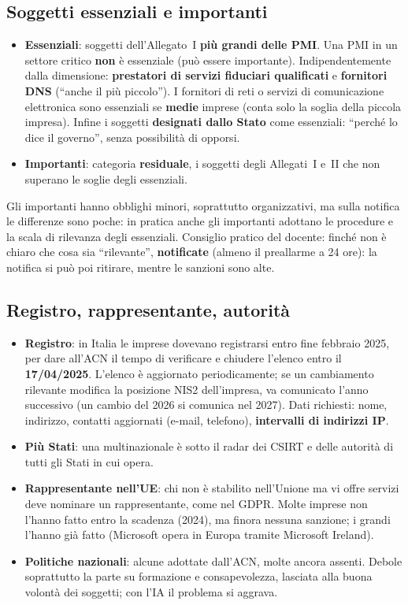 \subsection{Soggetti essenziali e importanti}
\begin{itemize}
  \item \textbf{Essenziali}: soggetti dell'Allegato~I \textbf{più grandi delle PMI}. Una PMI in un
    settore critico \textbf{non} è essenziale (può essere importante). Indipendentemente dalla
    dimensione: \textbf{prestatori di servizi fiduciari qualificati} e \textbf{fornitori DNS} (``anche il
    più piccolo''). I fornitori di reti o servizi di comunicazione elettronica sono essenziali se
    \textbf{medie} imprese (conta solo la soglia della piccola impresa). Infine i soggetti
    \textbf{designati dallo Stato} come essenziali: ``perché lo dice il governo'', senza possibilità di
    opporsi.
  \item \textbf{Importanti}: categoria \textbf{residuale}, i soggetti degli Allegati~I e~II che non
    superano le soglie degli essenziali.
\end{itemize}
Gli importanti hanno obblighi minori, soprattutto organizzativi, ma sulla notifica le differenze sono
poche: in pratica anche gli importanti adottano le procedure e la scala di rilevanza degli essenziali.
Consiglio pratico del docente: finché non è chiaro che cosa sia ``rilevante'', \textbf{notificate}
(almeno il preallarme a 24 ore): la notifica si può poi ritirare, mentre le sanzioni sono alte.

\subsection{Registro, rappresentante, autorità}
\begin{itemize}
  \item \textbf{Registro}: in Italia le imprese dovevano registrarsi entro fine febbraio 2025, per dare
    all'ACN il tempo di verificare e chiudere l'elenco entro il \textbf{17/04/2025}. L'elenco è
    aggiornato periodicamente; se un cambiamento rilevante modifica la posizione NIS2 dell'impresa, va
    comunicato l'anno successivo (un cambio del 2026 si comunica nel 2027). Dati richiesti: nome,
    indirizzo, contatti aggiornati (e-mail, telefono), \textbf{intervalli di indirizzi IP}.
  \item \textbf{Più Stati}: una multinazionale è sotto il radar dei CSIRT e delle autorità di tutti gli
    Stati in cui opera.
  \item \textbf{Rappresentante nell'UE}: chi non è stabilito nell'Unione ma vi offre servizi deve
    nominare un rappresentante, come nel GDPR. Molte imprese non l'hanno fatto entro la scadenza (2024),
    ma finora nessuna sanzione; i grandi l'hanno già fatto (Microsoft opera in Europa tramite Microsoft
    Ireland).
  \item \textbf{Politiche nazionali}: alcune adottate dall'ACN, molte ancora assenti. Debole soprattutto
    la parte su formazione e consapevolezza, lasciata alla buona volontà dei soggetti; con l'IA il
    problema si aggrava.
\end{itemize}

